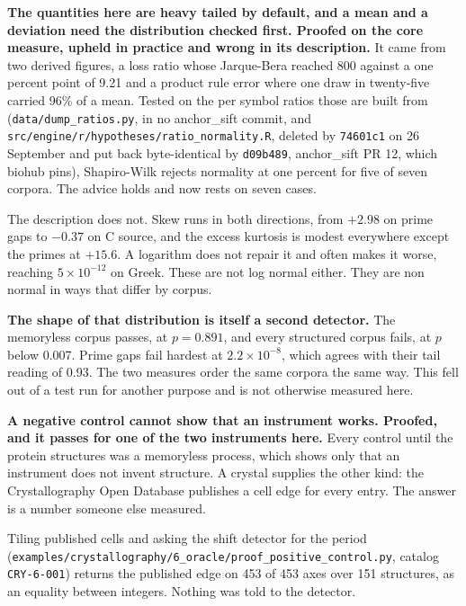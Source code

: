 \textbf{The quantities here are heavy tailed by default, and a mean and a deviation need the distribution checked first. Proofed on the core measure, upheld in practice and wrong in its description.} It came from two derived figures, a loss ratio whose Jarque-Bera reached 800 against a one percent point of 9.21 and a product rule error where one draw in twenty-five carried 96\% of a mean. Tested on the per symbol ratios those are built from (\texttt{data/\allowbreak{}dump\_\allowbreak{}ratios.\allowbreak{}py}, in no anchor\_sift commit, and \texttt{src/\allowbreak{}engine/\allowbreak{}r/\allowbreak{}hypotheses/\allowbreak{}ratio\_\allowbreak{}normality.\allowbreak{}R}, deleted by \texttt{74601c1} on 26 September and put back byte-identical by \texttt{d09b489}, anchor\_sift PR 12, which biohub pins), Shapiro-Wilk rejects normality at one percent for five of seven corpora. The advice holds and now rests on seven cases.

The description does not. Skew runs in both directions, from \(+2.98\) on prime gaps to \(-0.37\) on C source, and the excess kurtosis is modest everywhere except the primes at \(+15.6\). A logarithm does not repair it and often makes it worse, reaching \(5 \times 10^{-12}\) on Greek. These are not log normal either. They are non normal in ways that differ by corpus.

\textbf{The shape of that distribution is itself a second detector.} The memoryless corpus passes, at \(p = 0.891\), and every structured corpus fails, at \(p\) below 0.007. Prime gaps fail hardest at \(2.2 \times 10^{-8}\), which agrees with their tail reading of 0.93. The two measures order the same corpora the same way. This fell out of a test run for another purpose and is not otherwise measured here.

\textbf{A negative control cannot show that an instrument works. Proofed, and it passes for one of the two instruments here.} Every control until the protein structures was a memoryless process, which shows only that an instrument does not invent structure. A crystal supplies the other kind: the Crystallography Open Database publishes a cell edge for every entry. The answer is a number someone else measured.

Tiling published cells and asking the shift detector for the period (\texttt{examples/\allowbreak{}crystallography/\allowbreak{}6\_\allowbreak{}oracle/\allowbreak{}proof\_\allowbreak{}positive\_\allowbreak{}control.\allowbreak{}py}, catalog \texttt{CRY-6-001}) returns the published edge on 453 of 453 axes over 151 structures, as an equality between integers. Nothing was told to the detector.

